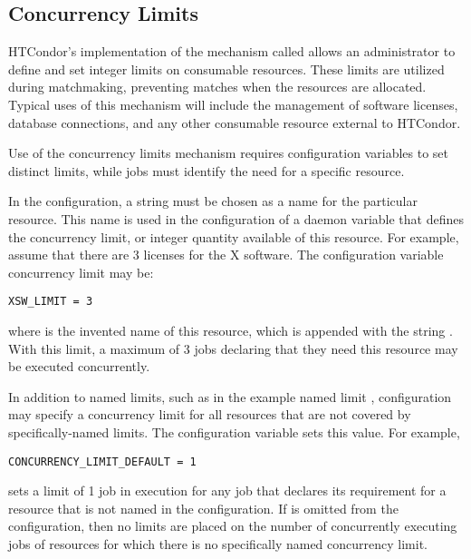 \subsection{\label{sec:Concurrency-Limits}Concurrency Limits} 

HTCondor's implementation of the mechanism called 
allows an administrator to define and set integer limits on
consumable resources.
These limits are utilized during matchmaking, preventing matches when
the resources are allocated.
Typical uses of this mechanism will include
the management of software licenses, database connections,
and any other consumable resource external to HTCondor.

Use of the concurrency limits mechanism requires configuration variables
to set distinct limits,
while jobs must identify the need for a specific resource.

In the configuration, a string must be chosen as a name for the
particular resource.
This name is used in the configuration of a  daemon
variable that defines the concurrency limit, or integer quantity
available of this resource.
For example, assume that there are 3 licenses for the X software.
The configuration variable concurrency limit may be:
\begin{verbatim}
XSW_LIMIT = 3
\end{verbatim}
where  is the invented name of this resource,
which is appended with the string .
With this limit, a maximum of 3 jobs declaring that they need this
resource may be executed concurrently.

In addition to named limits, such as in the example named limit ,
configuration may specify a concurrency limit for all resources
that are not covered by specifically-named limits.
The configuration variable  sets
this value.  For example,
\begin{verbatim}
CONCURRENCY_LIMIT_DEFAULT = 1
\end{verbatim}
sets a limit of 1 job in execution for any job that declares its
requirement for a resource that is not named in the configuration.
If  is omitted  from the
configuration, then no limits are placed on the number of 
concurrently executing jobs of resources for which there is no
specifically named concurrency limit. 

